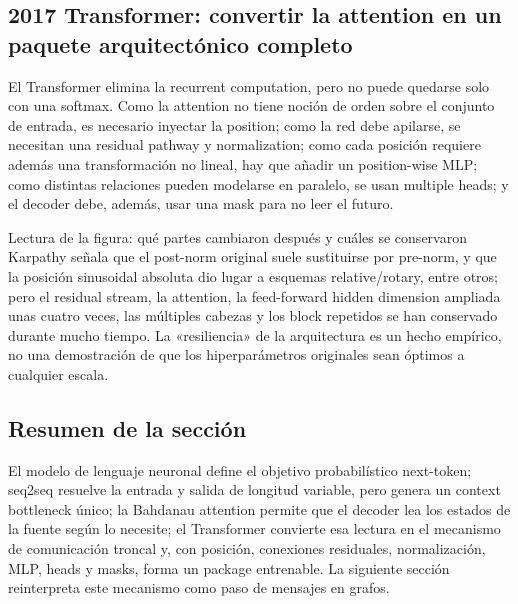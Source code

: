 
\subsection{2017 Transformer: convertir la attention en un paquete arquitectónico completo}

El Transformer elimina la recurrent computation, pero no puede quedarse solo con una softmax. Como la attention no tiene noción de orden sobre el conjunto de entrada, es necesario inyectar la position; como la red debe apilarse, se necesitan una residual pathway y normalization; como cada posición requiere además una transformación no lineal, hay que añadir un position-wise MLP; como distintas relaciones pueden modelarse en paralelo, se usan multiple heads; y el decoder debe, además, usar una mask para no leer el futuro.


\begin{knowledgebox}{Lectura de la figura: qué partes cambiaron después y cuáles se conservaron}
Karpathy señala que el post-norm original suele sustituirse por pre-norm, y que la posición sinusoidal absoluta dio lugar a esquemas relative/rotary, entre otros; pero el residual stream, la attention, la feed-forward hidden dimension ampliada unas cuatro veces, las múltiples cabezas y los block repetidos se han conservado durante mucho tiempo. La «resiliencia» de la arquitectura es un hecho empírico, no una demostración de que los hiperparámetros originales sean óptimos a cualquier escala.
\end{knowledgebox}

\subsection{Resumen de la sección}

El modelo de lenguaje neuronal define el objetivo probabilístico next-token; seq2seq resuelve la entrada y salida de longitud variable, pero genera un context bottleneck único; la Bahdanau attention permite que el decoder lea los estados de la fuente según lo necesite; el Transformer convierte esa lectura en el mecanismo de comunicación troncal y, con posición, conexiones residuales, normalización, MLP, heads y masks, forma un package entrenable. La siguiente sección reinterpreta este mecanismo como paso de mensajes en grafos.
